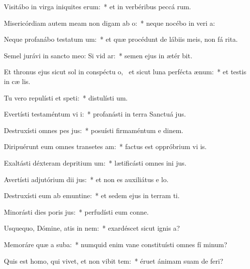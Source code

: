 \item Visitábo in virga iniquites erum:~* et in verbéribus peccá rum.
\item Misericórdiam autem meam non digam ab o:~* neque nocébo in veri a:
\item Neque profanábo testatum um:~* et quæ procédunt de lábiis meis, non fá rita.
\item Semel jurávi in sancto meo: Si vid ar:~* semen ejus in ætér bit.
\item Et thronus ejus sicut sol in conspéctu o,~\pscross{} et sicut luna perfécta  ænum:~* et testis in cæ lis.
\item Tu vero repulísti et speti:~* distulísti  um.
\item Evertísti testaméntum vi i:~* profanásti in terra Sanctuá jus.
\item Destruxísti omnes pes jus:~* posuísti firmaméntum e dinem.
\item Diripuérunt eum omnes transetes am:~* factus est oppróbrium vi is.
\item Exaltásti déxteram depritium um:~* lætificásti omnes ini jus.
\item Avertísti adjutórium dii jus:~* et non es auxiliátus e  lo.
\item Destruxísti eum ab emuntine:~* et sedem ejus in terram ti.
\item Minorásti dies poris jus:~* perfudísti eum conne.
\item Usquequo, Dómine, atis in nem:~* exardéscet sicut ignis  a?
\item Memoráre quæ a suba:~* numquid enim vane constituísti omnes fí minum?
\item Quis est homo, qui vivet, et non vibit tem:~* éruet ánimam suam de  feri?
